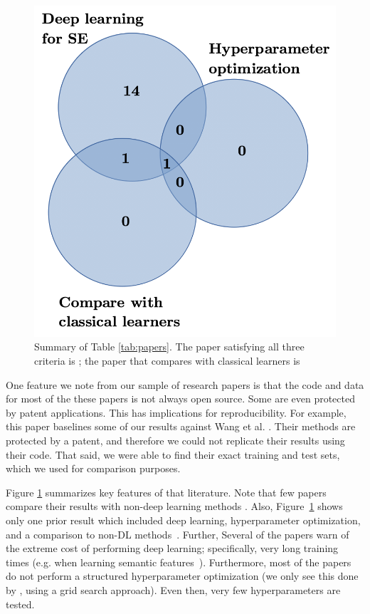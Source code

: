 \documentclass[10pt,compsoc,twocolumn]{IEEEtran}
\begin{document}
    \begin{figure}%
     \begin{center}
    \includegraphics[width=.5\linewidth]{venn.png}
       \end{center} 
    \caption{Summary of Table \ref{tab:papers}. The paper satisfying all three criteria is \cite{wang2016automatically}; the paper that compares with classical learners is \cite{dam2019lessons}}
    \label{fig:venn}
\end{figure}
One  feature we note from our sample of research papers
 is that the code and data for most of the these papers is not always open source. Some are even protected by patent applications. This has implications for reproducibility. For example, 
 this paper
 baselines
 some of our
 results against
  Wang et al. \cite{wang2016automatically}.
  Their methods
  are protected by a patent, and therefore we could not replicate their results using their code.
  That said, we were able to 
  find their exact training and test sets,
  which we used
  for comparison purposes.
 
 Figure \ref{fig:venn} summarizes key features of that literature. 
 Note that few papers compare their results with non-deep learning methods \cite{wang2016automatically,dam2019lessons}. Also, 
Figure~\ref{fig:venn} shows only one prior
result which included deep learning, hyperparameter optimization, and a comparison to non-DL methods~\cite{wang2016automatically}. 
Further,
Several of the papers warn of the extreme   cost of performing deep learning; specifically, very long training times 
(e.g. when learning semantic features~\cite{wang2016automatically}).
Furthermore,
most of the papers do not perform a structured hyperparameter optimization (we only see this done by \cite{wang2016automatically}, using a grid search approach). Even then, very few hyperparameters are tested.
\end{document}
